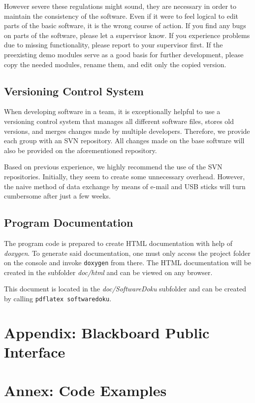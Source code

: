 \documentclass[a4paper, 11pt]{article}
\newcommand{\codeex}[2][0.98\textwidth]{\vspace*{1ex}\noindent\fbox{\parbox{#1}{}}\vspace*{1ex}}
\begin{document}
However severe these regulations might sound, they are necessary in order to maintain the consistency of the software. Even if it were to feel logical to edit parts of the basic software, it is the wrong course of action. If you find any bugs on parts of the software, please let a supervisor know. If you experience problems due to missing functionality, please report to your supervisor first. If the preexisting demo modules serve as a good basis for further development, please copy the needed modules, rename them, and edit only the copied version.

\subsection{Versioning Control System}

When developing software in a team, it is exceptionally helpful to use a versioning control system that manages all different software files, stores old versions, and merges changes made by multiple developers. Therefore, we provide each group with an SVN repository. All changes made on the base software will also be provided on the aforementioned repository. 

Based on previous experience, we highly recommend the use of the SVN repositories. Initially, they seem to create some unnecessary overhead. However, the naive method of data exchange by means of e-mail and USB sticks will turn cumbersome after just a few weeks.

\subsection{Program Documentation}

The program code is prepared to create HTML documentation with help of \textit{doxygen}. To generate said documentation, one must only access the project folder on the console and invoke \texttt{doxygen} from there. The HTML documentation will be created in the subfolder \textit{doc/html} and can be viewed on any browser. 

This document is located in the \textit{doc/SoftwareDoku} subfolder and can be created by calling \texttt{pdflatex softwaredoku}.

\appendix

\section{Appendix: Blackboard Public Interface}
\label{app:blackboard}

\codeex{blackboardInterface.h}

\section{Annex: Code Examples}
\label{app:codeexamples}

\codeex{DriveWigglyLines.cpp}
\pagebreak

\codeex{StopAtRed.cpp}
\pagebreak


\codeex{CyclicForwardsBackwards.cpp}
\end{document}

